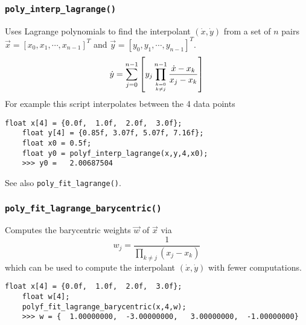 \subsubsection{{\tt poly\_interp\_lagrange()}}
\label{module:math:poly:polyf_interp_lagrange}
Uses Lagrange polynomials to find the interpolant
$(\dot{x},\dot{y})$ from a set of $n$ pairs
$\vec{x}=[x_0,x_1,\cdots,x_{n-1}]^T$ and 
$\vec{y}=[y_0,y_1,\cdots,y_{n-1}]^T$.
%
\begin{equation}
\label{eqn:math:poly:polyinterp_lagrange}
    \dot{y} =
        \sum_{j=0}^{n-1} {
            \left[
            y_j
            \prod_{{k=0}\atop{k \ne j}}^{n-1} {
                \frac{\dot{x}-x_k}{x_j-x_k}
            }
            \right]
        }
\end{equation}
%
For example this script interpolates between the 4 data points
%
\begin{Verbatim}[fontsize=\small]
    float x[4] = {0.0f,  1.0f,  2.0f,  3.0f};
    float y[4] = {0.85f, 3.07f, 5.07f, 7.16f};
    float x0 = 0.5f;
    float y0 = polyf_interp_lagrange(x,y,4,x0);
    >>> y0 =   2.00687504
\end{Verbatim}
%
See also {\tt poly\_fit\_lagrange()}.

\subsubsection{{\tt poly\_fit\_lagrange\_barycentric()}}
\label{module:math:poly:polyf_fit_lagrange_barycentric}
Computes the barycentric weights $\vec{w}$ of $\vec{x}$ via
%
\begin{equation}
\label{eqn:math:poly:polyfit_lagrange_barycentric}
    w_j =   \frac{1}{
                \prod_{k \ne j}{\left(x_j - x_k\right)}
            }
\end{equation}
%
which can be used to compute the interpolant $(\dot{x},\dot{y})$
with fewer computations.
%
\begin{Verbatim}[fontsize=\small]
    float x[4] = {0.0f,  1.0f,  2.0f,  3.0f};
    float w[4];
    polyf_fit_lagrange_barycentric(x,4,w);
    >>> w = {  1.00000000,  -3.00000000,   3.00000000,  -1.00000000}
\end{Verbatim}
%

